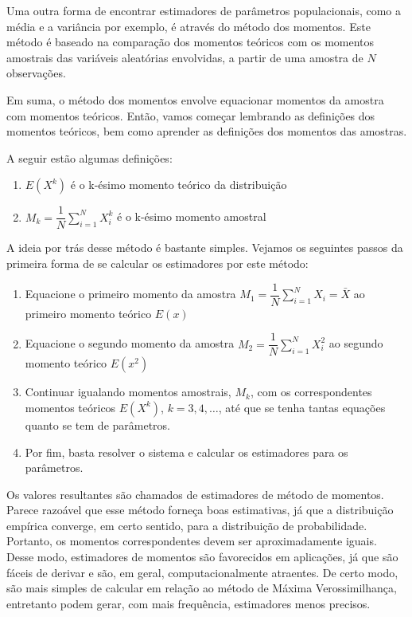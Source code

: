 Uma outra forma de encontrar estimadores de parâmetros populacionais, como a média e a variância por exemplo, é através do método dos momentos. Este método é baseado na comparação dos momentos teóricos com os momentos amostrais das variáveis aleatórias envolvidas, a partir de uma amostra de $N$ observações. 

Em suma, o método dos momentos envolve equacionar momentos da amostra com momentos teóricos. Então, vamos começar lembrando as definições dos momentos teóricos, bem como aprender as definições dos momentos das amostras.

A seguir estão algumas definições:

\begin{enumerate}
	\item $E(X^k)$ é o k-ésimo momento teórico da distribuição 
    \item $M_k=\dfrac{1}{N}\sum\limits_{i=1}^N X_i^k$ é o k-ésimo momento amostral 
\end{enumerate}

A ideia por trás desse método é bastante simples. Vejamos os seguintes passos da primeira forma de se calcular os estimadores por este método:
\begin{enumerate}
  \item Equacione o primeiro momento da amostra  $M_1=\dfrac{1}{N}\sum\limits_{i=1}^N X_i=\bar{X}$ ao primeiro momento teórico $E(x)$
  \item Equacione o segundo momento da amostra $M_2=\dfrac{1}{N}\sum\limits_{i=1}^N X_i^2$ ao segundo momento teórico $E(x^2)$
  \item Continuar igualando momentos amostrais, $M_k$, com os correspondentes momentos teóricos  $E(X^k)$, $k = 3, 4, \dots $, até que se tenha tantas equações quanto se tem de parâmetros.
  \item Por fim, basta resolver o sistema e calcular os estimadores para os parâmetros.
\end{enumerate}

Os valores resultantes são chamados de estimadores de método de momentos. Parece razoável que esse método forneça boas estimativas, já que a distribuição empírica converge, em certo sentido, para a distribuição de probabilidade. Portanto, os momentos correspondentes devem ser aproximadamente iguais. Desse modo, estimadores de momentos são favorecidos em aplicações, já que são fáceis de derivar e são, em geral, computacionalmente atraentes. De certo modo, são mais simples de calcular em relação ao método de Máxima Verossimilhança, entretanto podem gerar, com mais frequência, estimadores menos precisos. 

